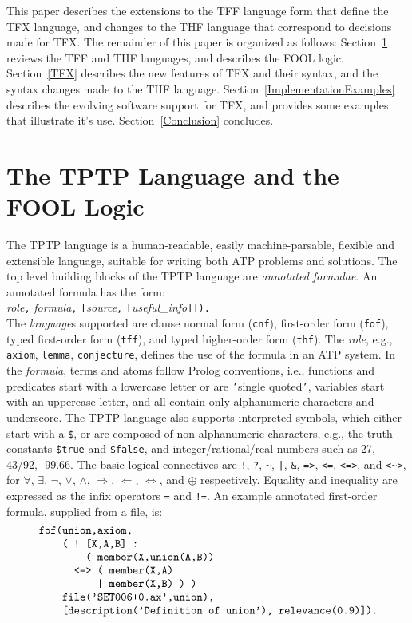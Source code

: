 \documentclass{easychair}
\begin{document}
This paper describes the extensions to the TFF language form that define the 
TFX language, and changes to the THF language that correspond to decisions 
made for TFX.
The remainder of this paper is organized as follows:
Section~\ref{TPTPFOOL} reviews the TFF and THF languages, and
describes the FOOL logic.
Section~\ref{TFX} describes the new features of TFX and their syntax, and 
the syntax changes made to the THF language.
Section~\ref{ImplementationExamples} describes the evolving software 
support for TFX, and provides some examples that illustrate it's use.
Section~\ref{Conclusion} concludes.

\section{The TPTP Language and the FOOL Logic}
\label{TPTPFOOL}

The TPTP language is a human-readable, easily machine-parsable, flexible and
extensible language, suitable for writing both ATP problems and solutions.
The top level building blocks of the TPTP language are {\em annotated
formulae}.
An annotated formula has the form:\\
{\em role}{\tt ,}
{\em formula}{\tt ,}
{\tt [}{\em source}{\tt ,}
{\tt [}{\em useful\_info}{\tt ]]).}\\
The {\em language}s supported are clause normal form ({\tt cnf}),
first-order form ({\tt fof}), typed first-order form ({\tt tff}), and
typed higher-order form ({\tt thf}).
The {\em role}, e.g., {\tt axiom}, {\tt lemma}, {\tt conjecture},
defines the use of the formula in an ATP system.
In the {\em formula}, terms and atoms follow Prolog conventions, i.e.,
functions and predicates start with a lowercase letter or are {\tt '}single
quoted{\tt '}, variables start with an uppercase letter, and all
contain only alphanumeric characters and underscore.
The TPTP language also supports interpreted symbols, which either start with a
{\tt \$}, or are composed of non-alphanumeric characters, e.g., the truth
constants {\tt \$true} and {\tt \$false}, and integer/rational/real
numbers such as 27, 43/92, -99.66.
The basic logical connectives are
{\tt !}, {\tt ?}, {\tt \verb|~|}, {\tt |}, {\tt \&}, {\tt =>}, {\tt <=},
{\tt <=>}, and {\tt <\verb|~|>},
for
$\forall$, $\exists$, $\neg$, $\vee$, $\wedge$, $\Rightarrow$, $\Leftarrow$,
$\Leftrightarrow$, and $\oplus$ respectively.
Equality and inequality are expressed as the infix operators {\tt =} and
{\tt !=}.
An example annotated first-order formula, supplied from a file, is:
\[
\begin{minipage}{\textwidth}
\begin{verbatim}
    fof(union,axiom,
        ( ! [X,A,B] :
            ( member(X,union(A,B))
          <=> ( member(X,A)
              | member(X,B) ) )
        file('SET006+0.ax',union),
        [description('Definition of union'), relevance(0.9)]).
\end{verbatim}
\end{minipage}
\]
\end{document}
